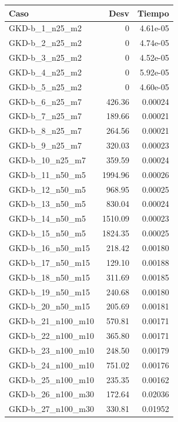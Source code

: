 \documentclass{article}
\begin{document}
\begin{table}[ht]
\centering
\footnotesize
\begin{tabular}{|l|r|r|}
\hline
\textbf{Caso} & \textbf{Desv} & \textbf{Tiempo} \\ \hline
GKD-b\_1\_n25\_m2 & 0 & 4.61e-05 \\ \hline
GKD-b\_2\_n25\_m2 & 0 & 4.74e-05 \\ \hline
GKD-b\_3\_n25\_m2 & 0 & 4.52e-05 \\ \hline
GKD-b\_4\_n25\_m2 & 0 & 5.92e-05 \\ \hline
GKD-b\_5\_n25\_m2 & 0 & 4.60e-05 \\ \hline
GKD-b\_6\_n25\_m7 & 426.36 & 0.00024 \\ \hline
GKD-b\_7\_n25\_m7 & 189.66 & 0.00021 \\ \hline
GKD-b\_8\_n25\_m7 & 264.56 & 0.00021 \\ \hline
GKD-b\_9\_n25\_m7 & 320.03 & 0.00023 \\ \hline
GKD-b\_10\_n25\_m7 & 359.59 & 0.00024 \\ \hline
GKD-b\_11\_n50\_m5 & 1994.96 & 0.00026 \\ \hline
GKD-b\_12\_n50\_m5 & 968.95 & 0.00025 \\ \hline
GKD-b\_13\_n50\_m5 & 830.04 & 0.00024 \\ \hline
GKD-b\_14\_n50\_m5 & 1510.09 & 0.00023 \\ \hline
GKD-b\_15\_n50\_m5 & 1824.35 & 0.00025 \\ \hline
GKD-b\_16\_n50\_m15 & 218.42 & 0.00180 \\ \hline
GKD-b\_17\_n50\_m15 & 129.10 & 0.00188 \\ \hline
GKD-b\_18\_n50\_m15 & 311.69 & 0.00185 \\ \hline
GKD-b\_19\_n50\_m15 & 240.68 & 0.00180 \\ \hline
GKD-b\_20\_n50\_m15 & 205.69 & 0.00181 \\ \hline
GKD-b\_21\_n100\_m10 & 570.81 & 0.00171 \\ \hline
GKD-b\_22\_n100\_m10 & 365.80 & 0.00171 \\ \hline
GKD-b\_23\_n100\_m10 & 248.50 & 0.00179 \\ \hline
GKD-b\_24\_n100\_m10 & 751.02 & 0.00176 \\ \hline
GKD-b\_25\_n100\_m10 & 235.35 & 0.00162 \\ \hline
GKD-b\_26\_n100\_m30 & 172.64 & 0.02036 \\ \hline
GKD-b\_27\_n100\_m30 & 330.81 & 0.01952 \\ \hline

\end{tabular}
\end{table}
\end{document}
